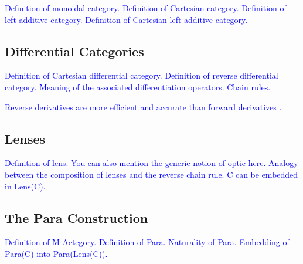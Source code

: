 \documentclass[12pt,a4paper,openright,twoside]{report}
\theoremstyle{plain}
\theoremstyle{definition}
\begin{document}
  \textcolor{blue}{Definition of monoidal category.}
  \textcolor{blue}{Definition of Cartesian category.}
  \textcolor{blue}{Definition of left-additive category.}
  \textcolor{blue}{Definition of Cartesian left-additive category.}

  \subsection{Differential Categories}

  \textcolor{blue}{Definition of Cartesian differential category.}
  \textcolor{blue}{Definition of reverse differential category.}
  \textcolor{blue}{Meaning of the associated differentiation operators.}
  \textcolor{blue}{Chain rules.}

  \textcolor{blue}{Reverse derivatives are more efficient and accurate than forward derivatives \cite{cockettReverseDerivativeCategories2019}.}



  \subsection{Lenses}

  \textcolor{blue}{Definition of lens. You can also mention the generic notion of optic here.}
  \textcolor{blue}{Analogy between the composition of lenses and the reverse chain rule.}
  \textcolor{blue}{C can be embedded in Lens(C).}



  \subsection{The Para Construction}

  \textcolor{blue}{Definition of M-Actegory.}
  \textcolor{blue}{Definition of Para.}
  \textcolor{blue}{Naturality of Para.}
  \textcolor{blue}{Embedding of Para(C) into Para(Lens(C)).}






\end{document}
